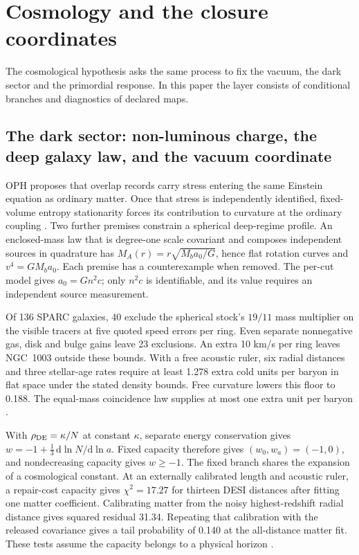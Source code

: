 \documentclass[11pt]{article}
\theoremstyle{definition}
\theoremstyle{remark}
\begin{document}
\section{Cosmology and the closure coordinates}
\label{sec:cosmology}

The cosmological hypothesis asks the same process to fix the vacuum, the dark sector and the
primordial response. In this paper the layer consists of conditional
branches and diagnostics of declared maps.

\subsection{The dark sector: non-luminous charge, the deep galaxy law, and the vacuum coordinate}
\label{sec:dark-sector}

OPH proposes that overlap records carry stress entering the same
Einstein equation as ordinary matter. Once that stress is independently
identified, fixed-volume entropy stationarity forces its contribution
to curvature at the ordinary coupling \cite{ophdarkmatter}.
Two further premises constrain a spherical deep-regime profile. An
enclosed-mass law that is degree-one scale covariant and composes
independent sources in quadrature has
$M_A(r)=r\sqrt{M_ba_0/G}$, hence flat rotation curves and
$v^4=GM_ba_0$. Each premise has a counterexample when removed.
The per-cut model gives $a_0=Gn^2c$; only $n^2c$ is identifiable,
and its value requires an independent source measurement.

Of 136 SPARC galaxies, 40 exclude the spherical stock's \(19/11\) mass
multiplier on the visible tracers at five quoted speed errors per ring.
Even separate nonnegative gas, disk and bulge gains leave 23 exclusions.
An extra 10 km/s per ring leaves NGC~1003 outside these bounds. With a
free acoustic ruler, six radial distances and three stellar-age rates
require at least 1.278 extra cold units per baryon in flat space under
the stated density bounds. Free curvature lowers this floor to 0.188.
The equal-mass coincidence law supplies at most one extra unit per
baryon \cite{ophdarkmatter}.

With $\rho_{\rm DE}=\kappa/N$ at constant $\kappa$, separate energy
conservation gives
$w=-1+\tfrac13\,\mathrm d\ln N/\mathrm d\ln a$.
Fixed capacity therefore gives $(w_0,w_a)=(-1,0)$, and nondecreasing
capacity gives $w\ge-1$. The fixed branch shares the expansion of a
cosmological constant. At an externally calibrated length and acoustic
ruler, a repair-cost capacity gives $\chi^2=17.27$ for thirteen DESI
distances after fitting one matter coefficient. Calibrating matter from
the noisy highest-redshift radial distance gives squared residual 31.34.
Repeating that calibration with the released covariance gives a tail
probability of 0.140 at the all-distance matter fit. These tests assume
the capacity belongs to a physical horizon \cite{ophvacuum}.
\end{document}
